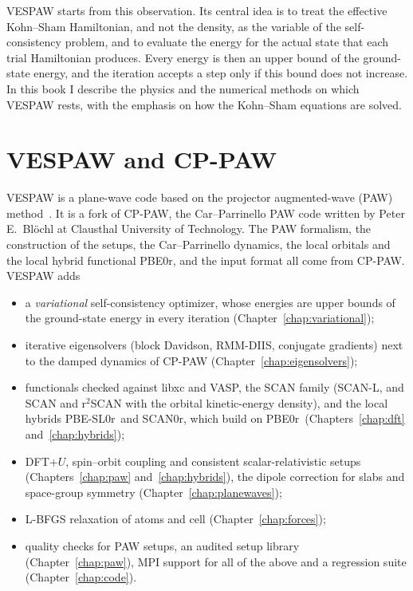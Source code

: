 \documentclass[11pt,a4paper,oneside]{book}
\newcommand{\pbezero}{PBE0r}
\newcommand{\scanzero}{SCAN0r}
\newcommand{\pbeslzero}{PBE-SL0r}
\begin{document}
VESPAW starts from this observation. Its central idea is to treat the
effective Kohn--Sham Hamiltonian, and not the density, as the variable
of the self-consistency problem, and to evaluate the energy for the
actual state that each trial Hamiltonian produces. Every energy is then
an upper bound of the ground-state energy, and the iteration accepts a
step only if this bound does not increase. In this book I describe the
physics and the numerical methods on which VESPAW rests, with the
emphasis on how the Kohn--Sham equations are solved.

\section{VESPAW and CP-PAW}

VESPAW is a plane-wave code based on the projector augmented-wave (PAW)
method~\cite{bloechl94_prb50_17953}. It is a fork of CP-PAW, the
Car--Parrinello PAW code written by Peter E.~Bl\"ochl at Clausthal
University of Technology. The PAW formalism, the construction of the
setups, the Car--Parrinello dynamics, the local orbitals and the local
hybrid functional \pbezero, and the input format all come from CP-PAW.
VESPAW adds
\begin{itemize}
\item a \emph{variational} self-consistency optimizer, whose energies
  are upper bounds of the ground-state energy in every iteration
  (Chapter~\ref{chap:variational});
\item iterative eigensolvers (block Davidson, RMM-DIIS, conjugate
  gradients) next to the damped dynamics of CP-PAW
  (Chapter~\ref{chap:eigensolvers});
\item functionals checked against libxc and VASP, the SCAN family
  (SCAN-L, and SCAN and r$^2$SCAN with the orbital kinetic-energy
  density), and the
  local hybrids \pbeslzero\ and \scanzero, which build on \pbezero\
  (Chapters~\ref{chap:dft} and~\ref{chap:hybrids});
\item DFT+$U$, spin--orbit coupling and consistent scalar-relativistic
  setups (Chapters~\ref{chap:paw} and~\ref{chap:hybrids}), the dipole
  correction for slabs and space-group symmetry
  (Chapter~\ref{chap:planewaves});
\item L-BFGS relaxation of atoms and cell (Chapter~\ref{chap:forces});
\item quality checks for PAW setups, an audited setup library
  (Chapter~\ref{chap:paw}), MPI support for all of the above and a
  regression suite (Chapter~\ref{chap:code}).
\end{itemize}
\end{document}

